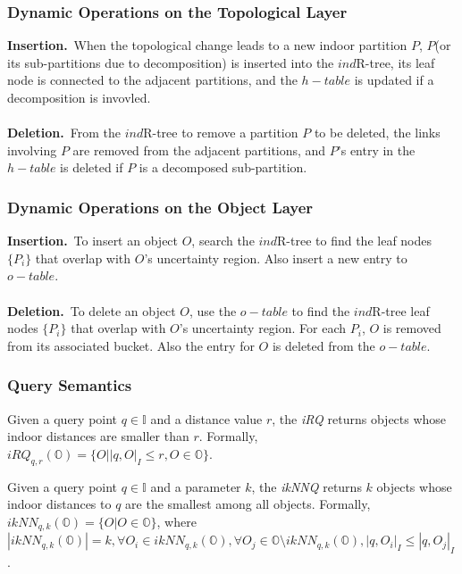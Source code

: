 
\begin{frame}
\frametitle{Dynamic Operations on the Topological Layer}

\textbf{Insertion.}~\textrm{When the topological change leads to a new indoor partition $P$, $P$(or its sub-partitions due to decomposition) is inserted into the $ind$R-tree, its leaf node is connected to the adjacent partitions, and the $h-table$ is updated if a decomposition is invovled.}\\~\\

\textbf{Deletion.}~\textrm{From the $ind$R-tree to remove a partition $P$ to be deleted, the links involving $P$ are removed from the adjacent partitions, and $P$'s entry in the $h-table$ is deleted if $P$ is a decomposed sub-partition.}

\end{frame}


\begin{frame}
\frametitle{Dynamic Operations on the Object Layer}

\textbf{Insertion.}~\textrm{To insert an object $O$, search the $ind$R-tree to find the leaf nodes $\{ P_i \}$ that overlap with $O$'s uncertainty region. Also insert a new entry to $o-table$.}\\~\\

\textbf{Deletion.}~\textrm{To delete an object $O$, use the $o-table$ to find the $ind$R-tree leaf nodes $\{ P_i \}$ that overlap with $O$'s uncertainty region. For each $P_i$, $O$ is removed from its associated bucket. Also the entry for $O$ is deleted from the $o-table$.}

\end{frame}


\begin{frame}
\frametitle{Query Semantics}

\begin{definition}
  Given a query point $q \in \mathbb{I}$ and a distance value $r$, the \emph{iRQ} returns objects whose indoor distances are smaller than $r$. Formally, $iRQ_{q,r}(\mathbb{O}) = \{ O | |q,O|_I \leq r, O \in \mathbb{O}\}$.
\end{definition}

\begin{definition}
  Given a query point $q \in \mathbb{I}$ and a parameter $k$, the \emph{ikNNQ} returns $k$ objects whose indoor distances to $q$ are the smallest among all objects. Formally, $ikNN_{q,k}(\mathbb{O}) = \{ O | O \in \mathbb{O}\}$, where $|ikNN_{q,k}(\mathbb{O})| = k, \forall O_i \in ikNN_{q,k}(\mathbb{O}), \forall O_j \in \mathbb{O} \setminus ikNN_{q,k}(\mathbb{O}), |q,O_i|_I \leq |q,O_j|_I$.
\end{definition}

\end{frame}

